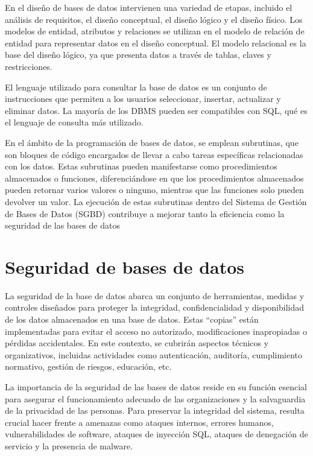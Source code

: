 \documentclass[11pt]{report}
\begin{document}
En el diseño de bases de datos intervienen una variedad de etapas, incluido el análisis de
requisitos, el diseño conceptual, el diseño lógico y el diseño físico. Los modelos de entidad,
atributos y relaciones se utilizan en el modelo de relación de entidad para representar datos
en el diseño conceptual. El modelo relacional es la base del diseño lógico, ya que presenta
datos a través de tablas, claves y restricciones.

El lenguaje utilizado para consultar la base de datos es un conjunto de instrucciones que
permiten a los usuarios seleccionar, insertar, actualizar y eliminar datos. La mayoría de los
DBMS pueden ser compatibles con SQL, qué es el lenguaje de consulta más utilizado.

En el ámbito de la programación de bases de datos, se emplean subrutinas, que son
bloques de código encargados de llevar a cabo tareas específicas relacionadas con los
datos. Estas subrutinas pueden manifestarse como procedimientos almacenados o
funciones, diferenciándose en que los procedimientos almacenados pueden retornar varios
valores o ninguno, mientras que las funciones solo pueden devolver un valor. La ejecución
de estas subrutinas dentro del Sistema de Gestión de Bases de Datos (SGBD) contribuye a
mejorar tanto la eficiencia como la seguridad de las bases de datos

\section{Seguridad de bases de datos}
La seguridad de la base de datos abarca un conjunto de herramientas, medidas y controles
diseñados para proteger la integridad, confidencialidad y disponibilidad de los datos
almacenados en una base de datos. Estas “copias” están implementadas para evitar el
acceso no autorizado, modificaciones inapropiadas o pérdidas accidentales. En este
contexto, se cubrirán aspectos técnicos y organizativos, incluidas actividades como
autenticación, auditoría, cumplimiento normativo, gestión de riesgos, educación, etc.

La importancia de la seguridad de las bases de datos reside en su función esencial para
asegurar el funcionamiento adecuado de las organizaciones y la salvaguardia de la
privacidad de las personas. Para preservar la integridad del sistema, resulta crucial hacer
frente a amenazas como ataques internos, errores humanos, vulnerabilidades de software,
ataques de inyección SQL, ataques de denegación de servicio y la presencia de malware.
\end{document}
